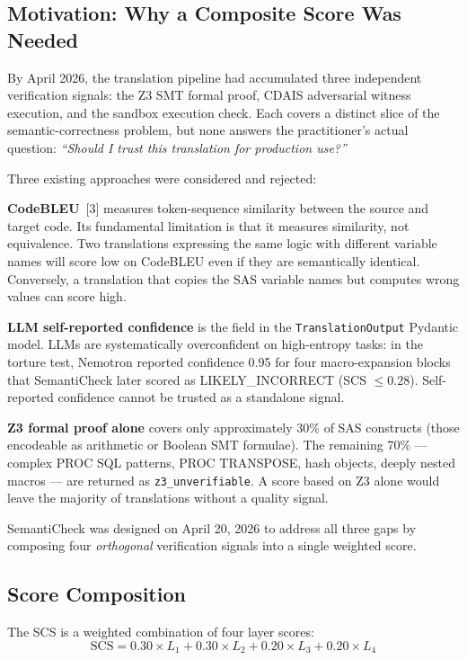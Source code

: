 \subsection{Motivation: Why a Composite Score Was Needed}
\label{subsec:semanticheck-motivation}

By April 2026, the translation pipeline had accumulated three independent
verification signals: the Z3 SMT formal proof, CDAIS adversarial witness
execution, and the sandbox execution check. Each covers a distinct slice of the
semantic-correctness problem, but none answers the practitioner's actual question:
\emph{``Should I trust this translation for production use?''}

Three existing approaches were considered and rejected:

\textbf{CodeBLEU}~[3] measures token-sequence similarity between the source
and target code. Its fundamental limitation is that it measures similarity, not
equivalence. Two translations expressing the same logic with different variable
names will score low on CodeBLEU even if they are semantically identical.
Conversely, a translation that copies the SAS variable names but computes
wrong values can score high.

\textbf{LLM self-reported confidence} is the field in the
\texttt{TranslationOutput} Pydantic model. LLMs are systematically overconfident
on high-entropy tasks: in the torture test, Nemotron reported confidence 0.95
for four macro-expansion blocks that SemantiCheck later scored as
LIKELY\_INCORRECT (SCS $\leq 0.28$). Self-reported confidence cannot be trusted
as a standalone signal.

\textbf{Z3 formal proof alone} covers only approximately 30\% of SAS constructs
(those encodeable as arithmetic or Boolean SMT formulae). The remaining 70\% ---
complex PROC SQL patterns, PROC TRANSPOSE, hash objects, deeply nested macros ---
are returned as \texttt{z3\_unverifiable}. A score based on Z3 alone would
leave the majority of translations without a quality signal.

SemantiCheck was designed on April 20, 2026 to address all three gaps by
composing four \emph{orthogonal} verification signals into a single weighted
score.

\subsection{Score Composition}
\label{subsec:semanticheck-score}

The \ac{SCS} is a weighted combination of four layer scores:
\begin{equation}
  \mathrm{SCS} = 0.30 \times L_1 + 0.30 \times L_2 + 0.20 \times L_3 + 0.20 \times L_4
  \label{eq:scs}
\end{equation}

